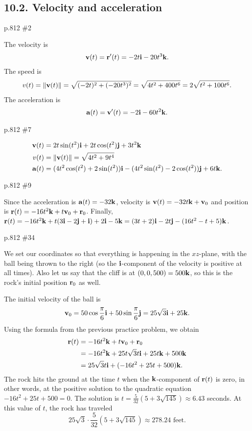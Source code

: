 \subsection*{10.2. Velocity and acceleration}
\begin{practice}p.812 \#2\end{practice}
\begin{pracsol}
  The velocity is
  \[\mathbf v(t)=\mathbf r'(t)=-2t\mathbf i-20t^3\mathbf k.\]
  The speed is
  \[v(t)=\|\mathbf v(t)\|=\sqrt{(-2t)^2+(-20t^3)^2}=\sqrt{4t^2+400t^6}=2\sqrt{t^2+100t^6}.\]
  The acceleration is
  \[\mathbf a(t)=\mathbf v'(t)=-2\mathbf i-60t^2\mathbf k.\]
\end{pracsol}
\begin{practice}p.812 \#7\end{practice}
\begin{pracsol}
  \begin{align*}
    \mathbf v(t) &= 2t\sin(t^2)\mathbf i+2t\cos(t^2)\mathbf j+3t^2\mathbf k\\
    v(t) &= \|\mathbf v(t)\|=\sqrt{4t^2+9t^4}\\
    \mathbf a(t) &= (4t^2\cos(t^2)+2\sin(t^2))\mathbf i-(4t^2\sin(t^2)-2\cos(t^2))\mathbf j+6t\mathbf k.
  \end{align*}
\end{pracsol}
\begin{practice}p.812 \#9\end{practice}
\begin{pracsol}
  Since the acceleration is $\mathbf a(t)=-32\mathbf k$, velocity is $\mathbf v(t)=-32t\mathbf k+\mathbf v_0$ and position is $\mathbf r(t)=-16t^2\mathbf k+t\mathbf v_0+\mathbf r_0$. Finally, $\mathbf r(t)=-16t^2\mathbf k+t(3\mathbf i-2\mathbf j+\mathbf i)+2\mathbf i-5\mathbf k=(3t+2)\mathbf i-2t\mathbf j-(16t^2-t+5)\mathbf k$.
\end{pracsol}
\begin{practice}p.812 \#34\end{practice}
\begin{pracsol}
  We set our coordinates so that everything is happening in the $xz$-plane, with the ball being thrown to the right (so the $\mathbf i$-component of the velocity is positive at all times). Also let us say that the cliff is at $(0,0,500)=500\mathbf k$, so this is the rock's initial position $\mathbf r_0$ as well.

  The initial velocity of the ball is
  \[\mathbf v_0=50\cos\frac{\pi}6\mathbf i+50\sin\frac{\pi}6\mathbf j=25\sqrt3\mathbf i+25\mathbf k.\]
  Using the formula from the previous practice problem, we obtain
  \[\begin{split}
    \mathbf r(t) &= -16t^2\mathbf k+t\mathbf v_0+\mathbf r_0\\
    &= -16t^2\mathbf k+25t\sqrt3 t\mathbf i+25t\mathbf k+500\mathbf k\\
    &= 25\sqrt3 t\mathbf i + (-16t^2+25t+500)\mathbf k.
  \end{split}\]
  The rock hits the ground at the time $t$ when the $\mathbf k$-component of $\mathbf r(t)$ is zero, in other words, at the positive solution to the quadratic equation $-16t^2+25t+500=0$. The solution is $t=\frac5{32}(5+3\sqrt{145})\approx 6.43$ seconds. At this value of $t$, the rock has traveled
  \[25\sqrt3 \cdot \frac5{32}(5+3\sqrt{145})\approx 278.24\text{ feet}.\]
\end{pracsol}

